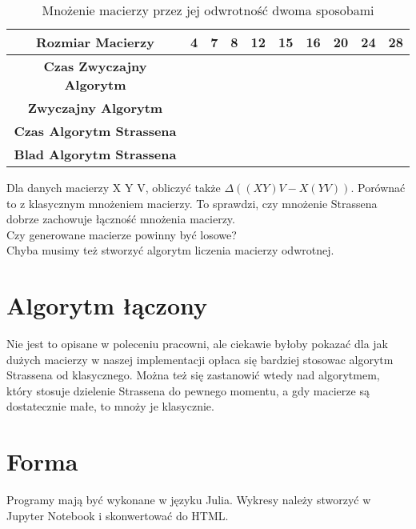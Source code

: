 \documentclass[paper=a4, fontsize=11pt]{scrartcl} %
\numberwithin{equation}{section} %
\numberwithin{figure}{section} %
\numberwithin{table}{section} %
\begin{document}

\begin{table}[]
\caption{Mnożenie macierzy przez jej odwrotność dwoma sposobami}
\label{my-label}
\begin{tabular}{|c|l|l|l|l|l|l|l|l|l|}
\hline
\textbf{Rozmiar Macierzy} & 4 & 7 & 8 & 12 & 15 & 16 & 20 & 24 & 28 \\ \hline
\textbf{Czas Zwyczajny Algorytm} &  &  &  &  &  &  &  &  &  \\ \hline
\textbf{Zwyczajny Algorytm} &  &  &  &  &  &  &  &  &  \\ \hline
\textbf{Czas Algorytm Strassena} &  &  &  &  &  &  &  &  &  \\ \hline
\textbf{Blad Algorytm Strassena} &  &  &  &  &  &  &  &  &  \\ \hline
\end{tabular}
\end{table}

Dla danych macierzy X Y V, obliczyć także ${\Delta((X Y)V - X(Y V))}$. Porównać to z klasycznym mnożeniem macierzy. To sprawdzi, czy mnożenie Strassena dobrze zachowuje łączność mnożenia macierzy.\\

Czy generowane macierze powinny być losowe?\\
Chyba musimy też stworzyć algorytm liczenia macierzy odwrotnej.

\section{Algorytm łączony}
Nie jest to opisane w poleceniu pracowni, ale ciekawie byłoby pokazać dla jak dużych macierzy w naszej implementacji opłaca się bardziej stosowac algorytm Strassena od klasycznego. Można też się zastanowić wtedy nad algorytmem, który stosuje dzielenie Strassena do pewnego momentu, a gdy macierze są dostatecznie małe, to mnoży je klasycznie.

\section{Forma}
Programy mają być wykonane w języku Julia. Wykresy należy stworzyć w Jupyter Notebook i skonwertować do HTML. 
\end{document}
